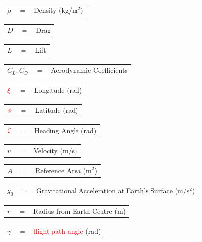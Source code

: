 \documentclass[journal]{new-aiaa}
\begin{document}
	  	\begin{tabular}{p{1.2cm}p{1cm}p{5cm}}
	  $\rho$ & $=$ & Density (kg/m$^2$)\\
	  	\end{tabular} 
	  			\begin{tabular}{p{1.2cm}p{1cm}p{5cm}}
	  				$D$ & $=$ & Drag\\
	  			\end{tabular} 
	  			\begin{tabular}{p{1.2cm}p{1cm}p{5cm}}
	  				$L$ & $=$ & Lift\\
	  			\end{tabular} 
	  	\begin{tabular}{p{1.2cm}p{1cm}p{5cm}}
	  $C_L,C_D$ & $=$ & Aerodynamic Coefficients\\
	  	\end{tabular} 
  	\begin{tabular}{p{1.2cm}p{1cm}p{5cm}}
  		$\textcolor{red}{\xi}$ & $=$ & Longitude (rad)\\
  	\end{tabular} 
  \begin{tabular}{p{1.2cm}p{1cm}p{5cm}}
  	$\textcolor{red}{\phi}$ & $=$ & Latitude (rad)\\
  \end{tabular} 
\begin{tabular}{p{1.2cm}p{1cm}p{5cm}}
	$\textcolor{red}{\zeta}$ & $=$ & Heading Angle (rad)\\
\end{tabular} 
	  	\begin{tabular}{p{1.2cm}p{1cm}p{5cm}}
	  $v$ & $=$ & Velocity (m/s)\\
	  	\end{tabular} 
	  	\begin{tabular}{p{1.2cm}p{1cm}p{5cm}}
	  $A$ & $=$ & Reference Area (m$^2$)\\
	  	\end{tabular} 
	  	\begin{tabular}{p{1.2cm}p{1cm}p{5cm}}
	  		$g_0$ & $=$ & Gravitational Acceleration at Earth's Surface (m/s$^2$)\\
	  	\end{tabular} 
	  	\begin{tabular}{p{1.2cm}p{1cm}p{5cm}}

	
	$r$ & $=$ & Radius from Earth Centre (m)\\
		\end{tabular} 
		\begin{tabular}{p{1.2cm}p{1cm}p{5cm}}
	  $\gamma$ & $=$ & \textcolor{red}{flight path angle} (rad)\\
	  	\end{tabular} 
\end{document}
